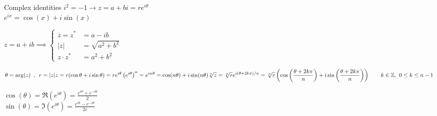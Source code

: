 \begin{topic}{Complex identities}
	$\displaystyle i^2 = -1 \to z = a + bi = r e^{i\theta}$ \\
	$\displaystyle e^{ix} = \cos(x) + i\sin(x)$

	$z = a + ib \implies \left\{
		\begin{aligned}
			\overline{z} = z^*       &= a - ib \\
			|z|       &= \sqrt{a^2 + b^2} \\
			z \cdot z^*     &= a^2 + b^2
		\end{aligned}
	\right.$

	$\displaystyle
	\theta = \arg(z) \hspace{0.5em}, \hspace{0.5em} r = |z| \\
	z = r(\cos\theta + i\sin\theta) = r e^{i\theta} \\ 
	\left(  e^{i\theta} \right)^n = e^{in\theta} = \cos(n\theta) + i\sin(n\theta) \\ 
	\sqrt[n]{z} = \sqrt[n]{r} e^{i(\theta + 2k\pi)/n}  \\
	= \sqrt[n]{r}\left( \cos\left(\frac{\theta + 2k\pi}n\right) + i \sin \left( \frac{\theta + 2k\pi}n \right) \right)
	\qquad k \in \mathbb{Z},\ 0 \le k \le n-1
	$

	$ \displaystyle \cos(\theta) = \Re \left( e^{i\theta} \right) = \frac{e^{i\theta} + e^{-i\theta}}2 $ \\ 
	$ \displaystyle \sin(\theta) = \Im \left( e^{i\theta} \right) = \frac{e^{i\theta} - e^{-i\theta}}{2i} $
	\endblock
\end{topic}
